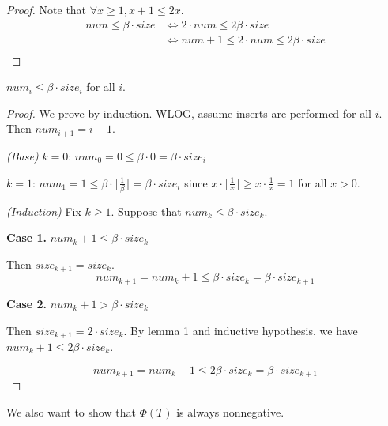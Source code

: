 \begin{proof}
    Note that $\forall x \geq 1, x + 1 \leq 2x$.
    \begin{equation*}
    \begin{split}
        num \leq \beta \cdot size & \Longleftrightarrow 2 \cdot num \leq 2 \beta \cdot size \\
        & \Longleftrightarrow num + 1 \leq 2 \cdot num \leq 2 \beta \cdot size \\
    \end{split}
    \end{equation*}
\end{proof}

\begin{claim}
    $num_i \leq \beta \cdot size_i$ for all $i$.
\end{claim}

\begin{proof}
    We prove by induction.
    WLOG, assume inserts are performed for all $i$.
    Then $num_{i+1} = i + 1$.
    
    \textit{(Base)}
    $k = 0$: $num_0 = 0 \leq \beta \cdot 0 = \beta \cdot size_i$

    $k = 1$: $num_1 = 1 \leq \beta \cdot \lceil \frac{1}{\beta} \rceil = \beta \cdot size_i$
    since $x \cdot \lceil \frac{1}{x} \rceil \geq x \cdot \frac{1}{x} = 1$ for all $x > 0$.

    \textit{(Induction)}
    Fix $k \geq 1$.
    Suppose that $num_k \leq \beta \cdot size_k$.

    \textbf{Case 1.}
    $num_k + 1 \leq \beta \cdot size_k$

    Then $size_{k+1} = size_k$.
    \begin{equation*}
        num_{k+1} = num_k + 1 \leq \beta \cdot size_k = \beta \cdot size_{k+1}
    \end{equation*}

    \textbf{Case 2.}
    $num_k + 1 > \beta \cdot size_k$
    
    Then $size_{k+1} = 2 \cdot size_k$.
    By lemma 1 and inductive hypothesis, we have
    $num_k + 1 \leq 2\beta \cdot size_k$.

    \begin{equation*}
        num_{k+1} = num_k + 1 \leq 2\beta \cdot size_k = \beta \cdot size_{k+1}
    \end{equation*}
\end{proof}

We also want to show that $\Phi(T)$ is always nonnegative.

